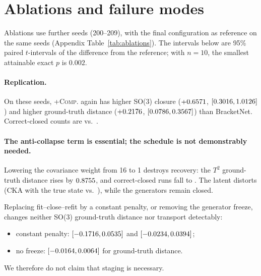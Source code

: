 \section{Ablations and failure modes}\label{sec:ablations}
Ablations use \NNabl{} further seeds (200--209), with the final configuration as reference on the same seeds
(Appendix Table~\ref{tab:ablations}). The intervals below are 95\% paired $t$-intervals of the difference from the
reference; with $n=10$, the smallest attainable exact $p$ is $0.002$.

\paragraph{Replication.}
On these seeds, \textsc{+Comp.} again has higher SO(3) closure ($+0.6571$,
$[0.3016,1.0126]$) and higher ground-truth distance
($+0.2176$,
$[0.0786,0.3567]$) than BracketNet. Correct-closed
counts are \NAbSOthreeCompreferenceCc{} vs.\ \NAbSOthreeReferenceCc.

\paragraph{The anti-collapse term is essential; the schedule is not demonstrably needed.}
Lowering the covariance weight from 16 to 1 destroys recovery: the $T^2$ ground-truth distance rises by
$0.8755$, and correct-closed runs fall to \NAbTtwoWeakanticollapseCc{}. The
latent distorts (CKA with the true state \NAbTtwoWeakanticollapseCkatruth{} vs.\ \NAbTtwoReferenceCkatruth), while the
generators remain closed.

Replacing fit--close--refit by a constant penalty, or removing the generator freeze, changes neither SO(3)
ground-truth distance nor transport detectably:
\begin{itemize}
\item constant penalty: $[-0.1716,0.0535]$ and
$[-0.0234,0.0394]$;
\item no freeze: $[-0.0164,0.0064]$ for ground-truth distance.
\end{itemize}
We therefore do not claim that staging is necessary.

